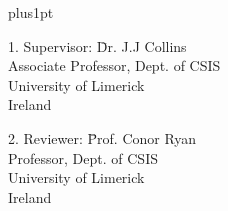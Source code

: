 



\renewcommand\baselinestretch{1.2}
\baselineskip=18pt plus1pt

\maketitle
\newpage

\begin{tabbing}
1. Supervisor: \= Dr. J.J Collins \\
    \> Associate Professor, Dept. of CSIS \\
    \> University of Limerick \\
    \> Ireland \\
\end{tabbing}
\begin{tabbing}
2. Reviewer: \= Prof. Conor Ryan \\
    \> Professor, Dept. of CSIS \\
    \> University of Limerick \\
    \> Ireland \\
\end{tabbing}



%




\hypersetup{pageanchor=false}
\frontmatter

%
%



\setcounter{secnumdepth}{3}
\setcounter{tocdepth}{3}
\tableofcontents

\listoftables
\listoffigures



\hypersetup{pageanchor=true}
\mainmatter











% 


